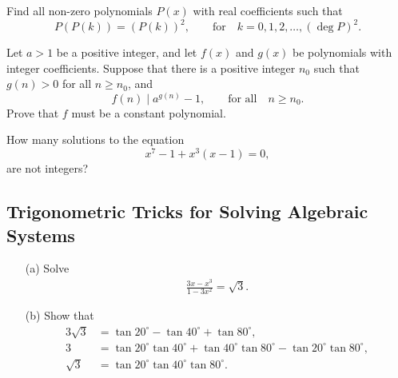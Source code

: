 \documentclass[12pt,a4paper]{memoir}
\theoremstyle{definition}
\begin{document}
\begin{question}[name={2011 Switzerland TST}]
	Find all non-zero polynomials $P(x)$ with real coefficients such that
	\[P(P(k))=\left(P(k)\right)^2,\qquad \text{for} \quad k=0,1,2,\dots,(\deg P)^2.\]
\end{question}



\begin{question}[name={2011 Switzerland TST}]
	Let $a>1$ be a positive integer, and let $f(x)$ and $g(x)$ be polynomials with integer coefficients. Suppose that there is a positive integer $n_0$ such that $g(n)>0$ for all $n\geq n_0$, and
	\[f(n) \mid a^{g(n)}-1, \qquad \text{for all} \quad n \geq n_0.\]
	Prove that $f$ must be a constant polynomial.
\end{question}


\begin{question}[name={2007 Ecuador TST}]
	How many solutions to the equation \[x^7-1+x^3(x-1)=0,\] are not integers?
\end{question}


\subsection{Trigonometric Tricks for Solving Algebraic Systems}



\begin{tcolorbox}
	\begin{question}
		\begin{itemize}
			\item[(a)] Solve
			\begin{align*}
				\frac{3x-x^3}{1-3x^2} = \sqrt 3.
			\end{align*}
			\item[(b)] Show that
			\begin{align*}
				3 \sqrt 3 &= \tan 20^\circ - \tan 40^\circ + \tan 80^\circ,\\
				3 &= \tan 20^\circ \tan 40^\circ + \tan 40^\circ \tan 80^\circ - \tan 20^\circ\tan 80^\circ,\\
				\sqrt 3 &= \tan 20^\circ \tan 40^\circ \tan 80^\circ.
			\end{align*}
		\end{itemize}
	\end{question}
\end{tcolorbox}
\end{document}
